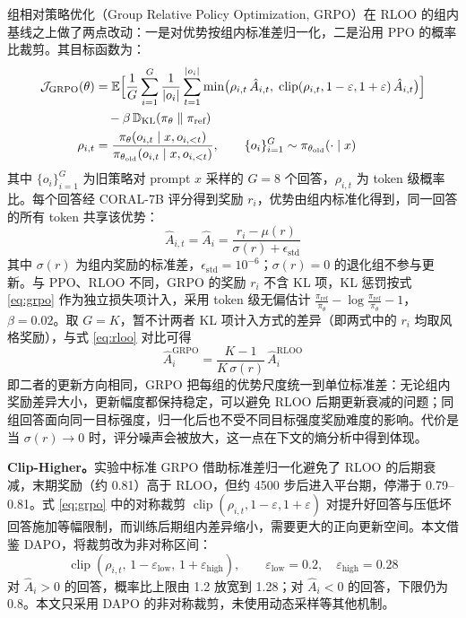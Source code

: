 \documentclass[fontset=fandol,type=master,campus=shenzhen,etitleauto=true]{hithesisbook}
\begin{document}
组相对策略优化（Group Relative Policy Optimization, GRPO）\cite{ref34}在 RLOO 的组内基线之上做了两点改动：一是对优势按组内标准差归一化，二是沿用 PPO 的概率比裁剪。其目标函数为：
\begin{equation}\label{eq:grpo}
\begin{aligned}
\mathcal{J}_{\text{GRPO}}(\theta) &= \mathbb{E} \Bigl[ \frac{1}{G}\sum_{i=1}^{G} \frac{1}{|o_i|}\sum_{t=1}^{|o_i|} \min\bigl( \rho_{i,t}\, \hat{A}_{i,t},\; \operatorname{clip}(\rho_{i,t}, 1-\varepsilon, 1+\varepsilon)\, \hat{A}_{i,t} \bigr) \Bigr] \\
&\quad - \beta\, \mathbb{D}_{\text{KL}}(\pi_\theta \parallel \pi_{\text{ref}}) \\
\rho_{i,t} &= \frac{\pi_\theta(o_{i,t} \mid x, o_{i,<t})}{\pi_{\theta_{\text{old}}}(o_{i,t} \mid x, o_{i,<t})}, \qquad \{o_i\}_{i=1}^{G} \sim \pi_{\theta_{\text{old}}}(\cdot \mid x)
\end{aligned}
\end{equation}
其中 $\{o_i\}_{i=1}^{G}$ 为旧策略对 prompt $x$ 采样的 $G = 8$ 个回答，$\rho_{i,t}$ 为 token 级概率比。每个回答经 CORAL-7B 评分得到奖励 $r_i$，优势由组内标准化得到，同一回答的所有 token 共享该优势：
\begin{equation}
\hat{A}_{i,t} = \hat{A}_i = \frac{r_i - \mu(r)}{\sigma(r) + \epsilon_{\text{std}}}
\end{equation}
其中 $\sigma(r)$ 为组内奖励的标准差，$\epsilon_{\text{std}} = 10^{-6}$；$\sigma(r) = 0$ 的退化组不参与更新。与 PPO、RLOO 不同，GRPO 的奖励 $r_i$ 不含 KL 项，KL 惩罚按式 \eqref{eq:grpo} 作为独立损失项计入，采用 token 级无偏估计 $\frac{\pi_{\text{ref}}}{\pi_\theta} - \log \frac{\pi_{\text{ref}}}{\pi_\theta} - 1$\cite{ref34}，$\beta = 0.02$。取 $G = K$，暂不计两者 KL 项计入方式的差异（即两式中的 $r_i$ 均取风格奖励），与式 \eqref{eq:rloo} 对比可得
\begin{equation}\label{eq:rloo-grpo}
\hat{A}_i^{\text{GRPO}} = \frac{K - 1}{K\, \sigma(r)}\, \hat{A}_i^{\text{RLOO}}
\end{equation}
即二者的更新方向相同，GRPO 把每组的优势尺度统一到单位标准差：无论组内奖励差异大小，更新幅度都保持稳定，可以避免 RLOO 后期更新衰减的问题；同组回答面向同一目标强度，归一化后也不受不同目标强度奖励难度的影响。代价是当 $\sigma(r) \to 0$ 时，评分噪声会被放大，这一点在下文的熵分析中得到体现。

\textbf{Clip-Higher。}实验中标准 GRPO 借助标准差归一化避免了 RLOO 的后期衰减，末期奖励（约 0.81）高于 RLOO，但约 4500 步后进入平台期，停滞于 0.79--0.81。式 \eqref{eq:grpo} 中的对称裁剪 $\operatorname{clip}(\rho_{i,t}, 1-\varepsilon, 1+\varepsilon)$ 对提升好回答与压低坏回答施加等幅限制，而训练后期组内差异缩小，需要更大的正向更新空间。本文借鉴 DAPO\cite{ref35}，将裁剪改为非对称区间：
\begin{equation}\label{eq:clip-higher}
\operatorname{clip}(\rho_{i,t},\, 1 - \varepsilon_{\text{low}},\, 1 + \varepsilon_{\text{high}}), \qquad \varepsilon_{\text{low}} = 0.2, \quad \varepsilon_{\text{high}} = 0.28
\end{equation}
对 $\hat{A}_i > 0$ 的回答，概率比上限由 1.2 放宽到 1.28；对 $\hat{A}_i < 0$ 的回答，下限仍为 0.8。本文只采用 DAPO 的非对称裁剪，未使用动态采样等其他机制。
\end{document}
